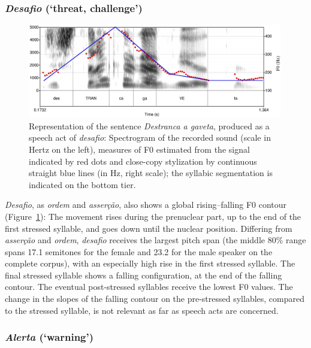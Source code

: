 \documentclass[output=paper]{LSP/langsci}
\begin{document}
\subsubsection{\textit{Desafio} (`threat, challenge')}

\begin{figure}

\includegraphics[width=0.99\textwidth]{figures/MOR6.eps}
\caption{Representation of the sentence \textit{Destranca a gaveta}, produced as a speech act of \textit{desafio}: Spectrogram of the recorded sound (scale in Hertz on the left), measures of F0 estimated from the signal indicated by red dots and close-copy stylization by continuous straight blue lines (in Hz, right scale); the syllabic segmentation is indicated on the bottom tier.}
\label{figure:CC4}
\end{figure}

\textit{Desafio}, as \textit{ordem} and \textit{asserção}, also shows a global rising–falling F0 contour (Figure~\ref{figure:CC4}): The movement rises during the prenuclear part, up to the end of the first stressed syllable, and goes down until the nuclear position. 
Differing from \textit{asserção} and \textit{ordem}, \textit{desafio} receives the largest pitch span (the middle 80\% range spans 17.1 semitones for the female and 23.2 for the male speaker on the complete corpus), with an especially high rise in the first stressed syllable. 
The final stressed syllable shows a falling configuration, at the end of the falling contour. 
The eventual post-stressed syllables receive the lowest F0 values. 
The change in the slopes of the falling contour on the pre-stressed syllables, compared to the stressed syllable, is not relevant as far as speech acts are concerned.


\subsubsection{\textit{Alerta} (`warning')}
\label{corpus:warning}
\end{document}

